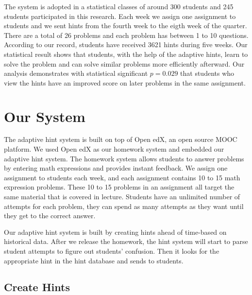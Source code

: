 \documentclass{llncs}
\begin{document}
The system is adopted in a statistical classes of around 300 students and 245 students participated in this research. Each week we assign one assignment to students and we sent hints from the fourth week to the eigth week of the quarter. There are a total of 26 problems and each problem has between 1 to 10 questions. According to our record, students have received 3621 hints during five weeks. Our statistical result shows that students, with the help of the adaptive hints, learn to solve the problem and can solve similar problems more efficiently afterward. Our analysis demonstrates with statistical significant $p=0.029$ that students who view the hints have an improved score on later problems in the same assignment.


\section{Our System}
The adaptive hint system is built on top of Open edX, an open source MOOC platform. We used Open edX as our homework system and embedded our adaptive hint system. The homework system allows students to answer problems by entering math expressions and provides instant feedback. We assign one assignment to students each week, and each assignment contains 10 to 15 math expression problems. These 10 to 15 problems in an assignment all target the same material that is covered in lecture. Students have an unlimited number of attempts for each problem, they can spend as many attempts as they want until they get to the correct answer.

Our adaptive hint system is built by creating hints ahead of time-based on historical data. After we release the homework, the hint system will start to parse student attempts to figure out students' confusion. Then it looks for the appropriate hint in the hint database and sends to students.

\subsection*{Create Hints}
\end{document}

